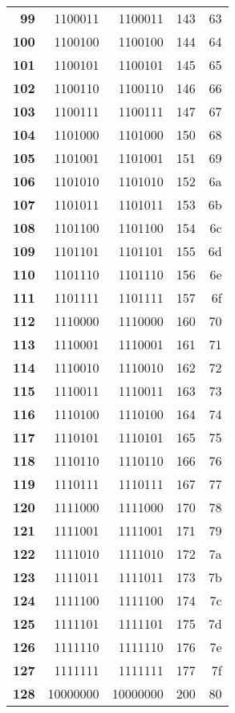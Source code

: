 \documentclass[a4paper]{article}
\begin{document}
\begin{tabular}{|>{\bfseries}r | r | r | r | r |}
99&1100011&1100011&143&63\\
100&1100100&1100100&144&64\\
101&1100101&1100101&145&65\\
102&1100110&1100110&146&66\\
103&1100111&1100111&147&67\\
104&1101000&1101000&150&68\\
105&1101001&1101001&151&69\\
106&1101010&1101010&152&6a\\
107&1101011&1101011&153&6b\\
108&1101100&1101100&154&6c\\
109&1101101&1101101&155&6d\\
110&1101110&1101110&156&6e\\
111&1101111&1101111&157&6f\\
112&1110000&1110000&160&70\\
113&1110001&1110001&161&71\\
114&1110010&1110010&162&72\\
115&1110011&1110011&163&73\\
116&1110100&1110100&164&74\\
117&1110101&1110101&165&75\\
118&1110110&1110110&166&76\\
119&1110111&1110111&167&77\\
120&1111000&1111000&170&78\\
121&1111001&1111001&171&79\\
122&1111010&1111010&172&7a\\
123&1111011&1111011&173&7b\\
124&1111100&1111100&174&7c\\
125&1111101&1111101&175&7d\\
126&1111110&1111110&176&7e\\
127&1111111&1111111&177&7f\\
128&10000000&10000000&200&80\\

\end{tabular}

\newpage
\end{document}
